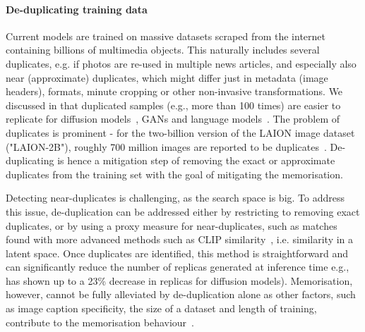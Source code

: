 \documentclass[conference,table]{IEEEtran} %
\begin{document}
\paragraph{De-duplicating training data} 
Current models are trained on massive datasets scraped from the internet containing billions of multimedia objects. This naturally includes several duplicates, e.g. if photos are re-used in multiple news articles, and especially also near (approximate) duplicates, which might differ just in metadata (image headers), formats, minute cropping or other non-invasive transformations. 
We discussed in  that duplicated samples (e.g., more than 100 times) are easier to replicate for diffusion models~\cite{carlini_extracting_2023}, GANs and language models~\cite{carlini_extracting_2021,kandpal_large_2023}.
The problem of duplicates is prominent - for the two-billion version of the LAION image dataset ("LAION-2B"), roughly 700 million images are reported to be duplicates~\cite{webster_-duplication_2023}.
De-duplicating is hence a mitigation step of removing the exact or approximate duplicates from the training set with the goal of mitigating the memorisation. 

Detecting near-duplicates is challenging, as the search space is big. 
To address this issue, de-duplication can be addressed either by restricting to removing exact duplicates, or by using a proxy measure for near-duplicates, such as matches found with more advanced methods such as CLIP similarity~\cite{radford_learning_2021,webster_-duplication_2023}, i.e. similarity in a latent space. 
Once duplicates are identified, this method is straightforward and can significantly reduce the number of replicas generated at inference time e.g., \cite{carlini_extracting_2023} has shown up to a 23\% decrease in replicas for diffusion models). 
Memorisation, however, cannot be fully alleviated by de-duplication alone as other factors, such as image caption specificity, the size of a dataset and length of training, contribute to the memorisation behaviour~\cite{somepalli_understanding_2023}.
\end{document}
